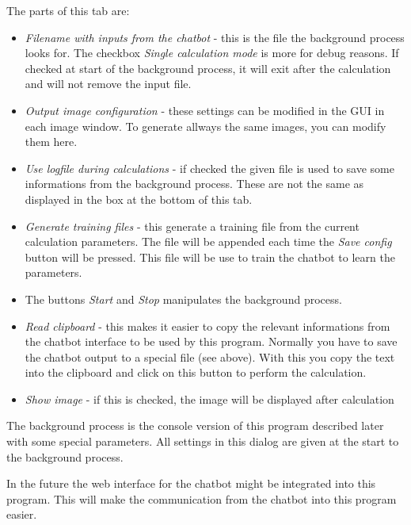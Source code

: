 \documentclass[11pt]{article} %
\begin{document}
The parts of this tab are:
\begin{itemize}\itemsep0pt
\item {\it Filename with inputs from the chatbot} - this is the file the background process looks for. The checkbox {\it Single calculation mode} is more for debug reasons. If checked at start of the background process, it will exit after the calculation and will  not remove the input file.
\item {\it Output image configuration} - these settings can be modified in the GUI in each image window. To generate allways the same images, you can modify them here.
\item {\it Use logfile during calculations} - if checked the given file is used to save some informations from the background process. These are not the same as displayed in the box at the bottom of this tab.
\item {\it Generate training files} - this generate a training file from the current calculation parameters. The file will be appended each time the {\it Save config} button will be pressed. This file will be use to train the chatbot to learn the parameters.
\item The buttons {\it Start} and {\it Stop} manipulates the background process.
\item {\it Read clipboard} - this makes it easier to copy the relevant informations from the chatbot interface to be used by this program. Normally you have to save the chatbot output to a special file (see above). With this you copy the text into the clipboard and click on this button to perform the calculation.
\item {\it Show image} - if this is checked, the image will be displayed after calculation
\end{itemize}
The background process is the console version of this program described later with some special parameters. All settings in this dialog are given at the start to the background process.

In the future the web interface for the chatbot might be integrated into this program. This will make the communication from the chatbot into this program easier.

\clearpage
\end{document}
